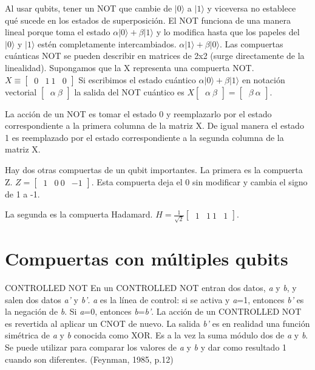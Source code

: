 \documentclass[11pt,a4paper]{article}
\begin{document}
Al usar qubits, tener un NOT que cambie de $\vert 0\rangle$ a $\vert 1\rangle$ y viceversa no establece qué sucede en los estados de superposición. 
El NOT funciona de una manera lineal porque toma el estado 
 $\alpha \vert 0\rangle + \beta \vert 1\rangle$
 y lo modifica hasta que los papeles del $\vert 0\rangle$ y $\vert 1\rangle$ estén completamente intercambiados. 
  $\alpha \vert 1\rangle + \beta \vert 0\rangle$. 
Las compuertas cuánticas NOT se pueden describir en matrices de 2x2 (surge directamente de la linealidad). Supongamos que la X representa una compuerta NOT. 
$X \equiv \begin{bmatrix}
		\ 0 & 1
		\ 1 & 0
	      \end{bmatrix}$
Si escribimos el estado cuántico $\alpha \vert 0\rangle + \beta \vert 1\rangle$ en notación vectorial
$
\begin{bmatrix}
 \ \alpha
 \ \beta
 \end{bmatrix}
$
la salida del NOT cuántico es 
$X \begin{bmatrix} 
     \ \alpha
     \ \beta
 \end{bmatrix}
 = \begin{bmatrix}
 \ \beta
 \ \alpha
 \end{bmatrix}$.
 
La acción de un NOT es tomar el estado 0 y reemplazarlo por el estado correspondiente a la primera columna de la matriz X. De igual manera el estado 1 es reemplazado por el estado correspondiente a la segunda columna de la matriz X. 

Hay dos otras compuertas de un qubit importantes. 
La primera es la compuerta Z. 
$Z = \begin{bmatrix}
 \ 1 & 0
 \ 0 & -1
 \end{bmatrix}$.
Esta compuerta deja el 0 sin modificar y cambia el signo de 1 a -1.

La segunda es la compuerta Hadamard.
$H =  \frac{1}{\sqrt{2}}  \begin{bmatrix}
             \ 1 & 1
             \ 1 & 1
           \end{bmatrix}$.

\section*{Compuertas con múltiples qubits}
CONTROLLED NOT
En un CONTROLLED NOT entran dos datos, \textit{a} y \textit{b}, y salen dos datos \textit{a'} y \textit{b'}. \textit{a} es la línea de control: si se activa y \textit{a}=1, entonces \textit{b'} es la negación de \textit{b}. Si \textit{a}=0, entonces \textit{b}=\textit{b'}. La acción de un CONTROLLED NOT es revertida al aplicar un CNOT de nuevo. 
La salida \textit{b'} es en realidad una función simétrica de \textit{a} y \textit{b} conocida como XOR. Es a la vez la suma módulo dos de \textit{a} y \textit{b}. Se puede utilizar para comparar los valores de \textit{a} y \textit{b} y dar como resultado 1 cuando son diferentes. (Feynman, 1985, p.12)
\end{document}
